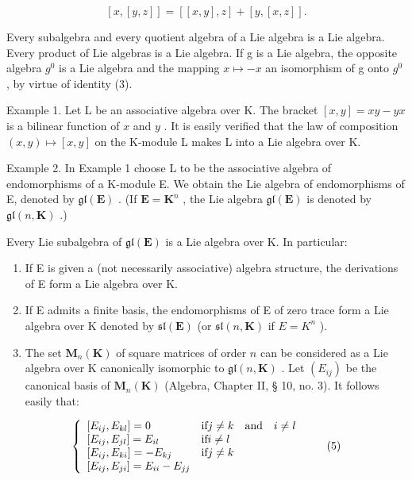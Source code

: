 \[
[ x, [ y, z ] ] = [ [ x, y ], z ] + [ y, [ x, z ] ].\tag{4}
\]

Every subalgebra and every quotient algebra of a Lie algebra is a Lie algebra. Every product of Lie algebras is a Lie algebra. If g is a Lie algebra, the opposite algebra \(g^{0}\) is a Lie algebra and the mapping \(x \mapsto -x\) an isomorphism of g onto \(g^{0}\) , by virtue of identity (3).

Example 1. Let L be an associative algebra over K. The bracket \([x, y] = xy - yx\) is a bilinear function of \(x\) and \(y\) . It is easily verified that the law of composition \((x, y) \mapsto [x, y]\) on the K-module L makes L into a Lie algebra over K.

Example 2. In Example 1 choose L to be the associative algebra of endomorphisms of a K-module E. We obtain the Lie algebra of endomorphisms of E, denoted by \(\mathfrak{gl}(\mathbf{E})\) . (If \(\mathbf{E} = \mathbf{K}^n\) , the Lie algebra \(\mathfrak{gl}(\mathbf{E})\) is denoted by \(\mathfrak{gl}(n, \mathbf{K})\) .)

Every Lie subalgebra of \(\mathfrak{gl}(\mathbf{E})\) is a Lie algebra over K. In particular:

\begin{enumerate}
\def\labelenumi{(\arabic{enumi})}
\item
  If E is given a (not necessarily associative) algebra structure, the derivations of E form a Lie algebra over K.
\item
  If E admits a finite basis, the endomorphisms of E of zero trace form a Lie algebra over K denoted by \(\mathfrak{sl}(\mathbf{E})\) (or \(\mathfrak{sl}(n,\mathbf{K})\) if \(E = K^{n}\) ).
\item
  The set \(\mathbf{M}_n(\mathbf{K})\) of square matrices of order \(n\) can be considered as a Lie algebra over K canonically isomorphic to \(\mathfrak{gl}(n, \mathbf{K})\) . Let \((E_{ij})\) be the canonical basis of \(\mathbf{M}_n(\mathbf{K})\) (Algebra, Chapter II, § 10, no. 3). It follows easily that:
\end{enumerate}

\[
\left\{ \begin{array}{l l} [ E _ {i j}, E _ {k l} ] = 0 & \text {if} j \neq k \quad \text {and} \quad i \neq l \\ {} [ E _ {i j}, E _ {j l} ] = E _ {i l} & \text {if} i \neq l \\ {} [ E _ {i j}, E _ {k i} ] = - E _ {k j} & \text {if} j \neq k \\ {} [ E _ {i j}, E _ {j i} ] = E _ {i i} - E _ {j j} \end{array} \right.\tag{5}
\]


